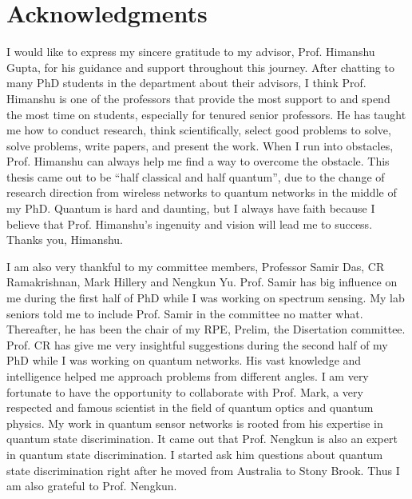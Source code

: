 \chapter{Acknowledgments}


I would like to express my sincere gratitude to my advisor, Prof. Himanshu Gupta, for his guidance and support throughout this journey. 
After chatting to many PhD students in the department about their advisors, I think Prof. Himanshu is one of the professors that provide 
the most support to and spend the most time on students, especially for tenured senior professors.
He has taught me how to conduct research, think scientifically, select good problems to solve, solve problems, write papers, and present the work.
When I run into obstacles, Prof. Himanshu can always help me find a way to overcome the obstacle.
This thesis came out to be ``half classical and half quantum'', due to the change of research direction from wireless networks to
quantum networks in the middle of my PhD. Quantum is hard and daunting, but I always have faith because I believe that 
Prof. Himanshu's ingenuity and vision will lead me to success. Thanks you, Himanshu.

I am also very thankful to my committee members, Professor Samir Das, CR Ramakrishnan, Mark Hillery and Nengkun Yu. 
Prof. Samir has big influence on me during the first half of PhD while I was working on spectrum sensing.
My lab seniors told me to include Prof. Samir in the committee no matter what. 
Thereafter, he has been the chair of my RPE, Prelim, the Disertation committee.
Prof. CR has give me very insightful suggestions during the second half of my PhD while I was working on quantum networks.
His vast knowledge and intelligence helped me approach problems from different angles.
I am very fortunate to have the opportunity to collaborate with Prof. Mark, a very respected and famous scientist 
in the field of quantum optics and quantum physics. My work in quantum sensor networks is rooted from his expertise in quantum state discrimination.
It came out that Prof. Nengkun is also an expert in quantum state discrimination. I started ask him questions about quantum state discrimination right after
he moved from Australia to Stony Brook. Thus I am also grateful to Prof. Nengkun.

